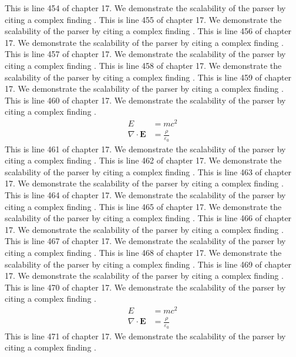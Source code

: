 This is line 454 of chapter 17. We demonstrate the scalability of the parser by citing a complex finding \cite{ref17_454}.
This is line 455 of chapter 17. We demonstrate the scalability of the parser by citing a complex finding \cite{ref17_455}.
This is line 456 of chapter 17. We demonstrate the scalability of the parser by citing a complex finding \cite{ref17_456}.
This is line 457 of chapter 17. We demonstrate the scalability of the parser by citing a complex finding \cite{ref17_457}.
This is line 458 of chapter 17. We demonstrate the scalability of the parser by citing a complex finding \cite{ref17_458}.
This is line 459 of chapter 17. We demonstrate the scalability of the parser by citing a complex finding \cite{ref17_459}.
This is line 460 of chapter 17. We demonstrate the scalability of the parser by citing a complex finding \cite{ref17_460}.
\begin{align*}
  E &= mc^2 \\
  \nabla \cdot \mathbf{E} &= \frac{\rho}{\varepsilon_0}
\end{align*}
This is line 461 of chapter 17. We demonstrate the scalability of the parser by citing a complex finding \cite{ref17_461}.
This is line 462 of chapter 17. We demonstrate the scalability of the parser by citing a complex finding \cite{ref17_462}.
This is line 463 of chapter 17. We demonstrate the scalability of the parser by citing a complex finding \cite{ref17_463}.
This is line 464 of chapter 17. We demonstrate the scalability of the parser by citing a complex finding \cite{ref17_464}.
This is line 465 of chapter 17. We demonstrate the scalability of the parser by citing a complex finding \cite{ref17_465}.
This is line 466 of chapter 17. We demonstrate the scalability of the parser by citing a complex finding \cite{ref17_466}.
This is line 467 of chapter 17. We demonstrate the scalability of the parser by citing a complex finding \cite{ref17_467}.
This is line 468 of chapter 17. We demonstrate the scalability of the parser by citing a complex finding \cite{ref17_468}.
This is line 469 of chapter 17. We demonstrate the scalability of the parser by citing a complex finding \cite{ref17_469}.
This is line 470 of chapter 17. We demonstrate the scalability of the parser by citing a complex finding \cite{ref17_470}.
\begin{align*}
  E &= mc^2 \\
  \nabla \cdot \mathbf{E} &= \frac{\rho}{\varepsilon_0}
\end{align*}
This is line 471 of chapter 17. We demonstrate the scalability of the parser by citing a complex finding \cite{ref17_471}.
